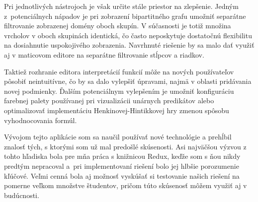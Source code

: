 Pri jednotlivých nástrojoch je však určite stále priestor na zlepšenie. Jedným z~potenciálnych nápadov je pri zobrazení bipartitného grafu umožniť separátne filtrovanie zobrazenej domény oboch skupín. V súčasnosti je totiž množina vrcholov v oboch skupinách identická, čo často neposkytuje dostatočnú flexibilitu na dosiahnutie uspokojivého zobrazenia. Navrhnuté riešenie by sa malo dať využiť aj v maticovom editore na separátne filtrovanie stĺpcov a riadkov.

Taktiež rozhranie editora interpretácií funkcií môže na nových používateľov pôsobiť neintuitívne, čo by sa dalo vylepšiť úpravami, najmä v oblasti pridávania novej podmienky. Ďalším potenciálnym vylepšením je umožniť konfiguráciu farebnej palety používanej pri vizualizácii unárnych predikátov alebo optimalizovať implementáciu Henkinovej-Hintikkovej hry zmenou spôsobu vyhodnocovania formúl.

Vývojom tejto aplikácie som sa naučil používať nové technológie a prehĺbil znalosť tých, s ktorými som už mal predošlé skúsenosti. Asi najväčšou výzvou z tohto hľadiska bola pre mňa práca s knižnicou Redux, keďže som s ňou nikdy predtým nepracoval a~pri implementovaní riešení bolo jej hlbšie porozumenie kľúčové. Veľmi cenná bola aj možnosť vyskúšať si testovanie našich riešení na pomerne veľkom množstve študentov, pričom túto skúsenosť môžem využiť aj v budúcnosti.



